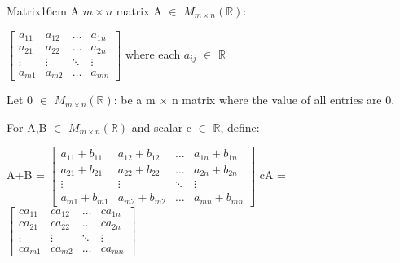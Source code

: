     \begin{definition}{Matrix}{16cm}
        A $m \times n$ {\color{lblue} matrix} A $\in$ $M_{m \times n}(\mathbb{R})$:

        \hspace{0.5cm}
        \footnotesize
        $\begin{bmatrix}
            a_{11} & a_{12} & \hdots & a_{1n} \\
            a_{21} & a_{22} & \hdots & a_{2n} \\
            \vdots & \vdots & \ddots & \vdots \\
            a_{m1} & a_{m2} & \hdots & a_{mn}
        \end{bmatrix}$
        \normalsize
        \hspace{0.5cm}
        where each $a_{ij}$ $\in$ $\mathbb{R}$

        Let 0 $\in$ $M_{m \times n}(\mathbb{R})$:
        be a m $\times$ n matrix where the value of all entries are 0.

        For A,B $\in$ $M_{m \times n}(\mathbb{R})$
        and scalar c $\in$ $\mathbb{R}$, define:

        \hspace{0.5cm}
        A+B =
        \footnotesize
        $\begin{bmatrix}
            a_{11}+b_{11} & a_{12}+b_{12} & \hdots & a_{1n}+b_{1n} \\
            a_{21}+b_{21} & a_{22}+b_{22} & \hdots & a_{2n}+b_{2n} \\
            \vdots & \vdots & \ddots & \vdots \\
            a_{m1}+b_{m1} & a_{m2}+b_{m2} & \hdots & a_{mn}+b_{mn}
        \end{bmatrix}$
        \normalsize
        \hspace{1cm}
        cA =
        \footnotesize
        $\begin{bmatrix}
            ca_{11} & ca_{12} & \hdots & ca_{1n} \\
            ca_{21} & ca_{22} & \hdots & ca_{2n} \\
            \vdots & \vdots & \ddots & \vdots \\
            ca_{m1} & ca_{m2} & \hdots & ca_{mn}
        \end{bmatrix}$
        \normalsize
    \end{definition}

    \vspace{0.5cm}



